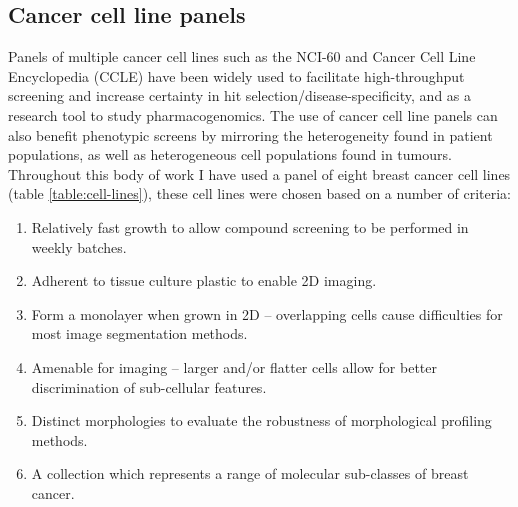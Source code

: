\documentclass[a4paper,11pt,twoside,openright]{scrbook}
\begin{document}
\subsection{Cancer cell line panels}
Panels of multiple cancer cell lines such as the NCI-60 and Cancer Cell Line Encyclopedia (CCLE) have been widely used to facilitate high-throughput screening and increase certainty in hit selection/disease-specificity,\cite{Wu1992,Shoemaker2006} and as a research tool to study pharmacogenomics. \cite{Heiser2012,Abaan2013,Jaeger2015}
The use of cancer cell line panels can also benefit phenotypic screens by mirroring the heterogeneity found in patient populations, as well as heterogeneous cell populations found in tumours. \cite{Caie2010}
Throughout this body of work I have used a panel of eight breast cancer cell lines (table \ref{table:cell-lines}), these cell lines were chosen based on a number of criteria:
\begin{enumerate}
    \item Relatively fast growth to allow compound screening to be performed in weekly batches.
    \item Adherent to tissue culture plastic to enable 2D imaging.
    \item Form a monolayer when grown in 2D -- overlapping cells cause difficulties for most image segmentation methods.
    \item Amenable for imaging -- larger and/or flatter cells allow for better discrimination of sub-cellular features.
    \item Distinct morphologies to evaluate the robustness of morphological profiling methods.
    \item A collection which represents a range of molecular sub-classes of breast cancer.
\end{enumerate}
\end{document}

